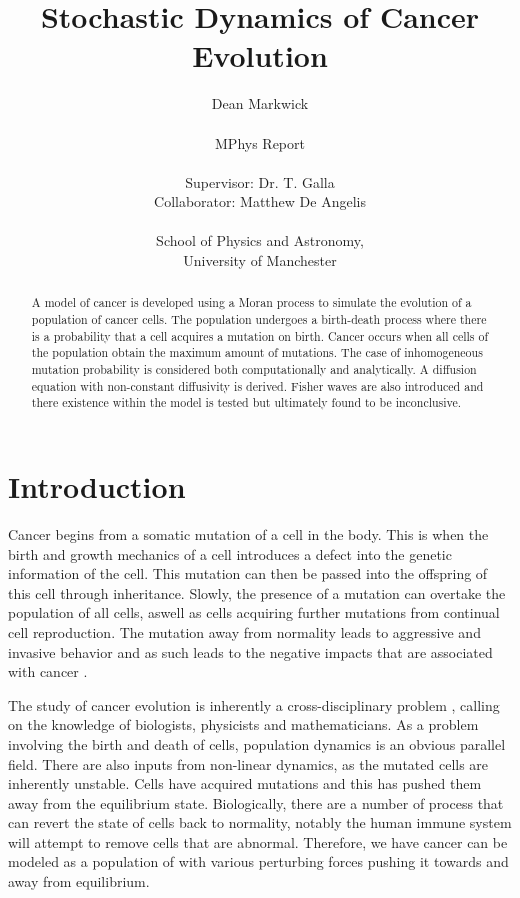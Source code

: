 \documentclass[12pt, a4paper,]{article}
\title{Stochastic Dynamics of Cancer Evolution}
\author{Dean Markwick \\
			\\
			MPhys Report \\
			\\
			Supervisor: Dr. T. Galla \\
			Collaborator: Matthew De Angelis 	\\
			\\
			School of Physics and Astronomy, \\
			University of Manchester					
			}
\let\cite=\supercite
\begin{document}
\maketitle

\begin{abstract}
A model of cancer is developed using a Moran process to simulate the evolution of a population of cancer cells. The population undergoes a birth-death process where there is a probability that a cell acquires a mutation on birth. Cancer occurs when all cells of the population obtain the maximum amount of mutations. The case of inhomogeneous mutation probability is considered both computationally and analytically. A diffusion equation with non-constant diffusivity is derived. Fisher waves are also introduced and there existence within the model is tested but ultimately found to be inconclusive. 
\end{abstract}


\thispagestyle{empty}

\newpage

\tableofcontents

\newpage

\section{Introduction}

Cancer begins from a somatic mutation of a cell in the body. This is when the birth and growth mechanics of a cell introduces a defect into the genetic information of the cell. This mutation can then be passed into the offspring of this cell through inheritance. Slowly, the presence of a mutation can overtake the population of all cells, aswell as cells acquiring further mutations from continual cell reproduction. The mutation away from normality leads to aggressive and invasive behavior and as such leads to the negative impacts that are associated with cancer \cite{weinberg_biology_2014}. 

The study of cancer evolution is inherently a cross-disciplinary problem \cite{sciences_converge}, calling on the knowledge of biologists, physicists and mathematicians. As a problem involving the birth and death of cells, population dynamics is an obvious parallel field. There are also inputs from non-linear dynamics, as the mutated cells are inherently unstable.  Cells have acquired mutations and this has pushed them away from the equilibrium state. Biologically, there are a number of process that can revert the state of cells back to normality, notably the human immune system will attempt to remove cells that are abnormal. Therefore, we have cancer can be modeled as a population of with various perturbing forces pushing it towards and away from equilibrium.
\end{document}
